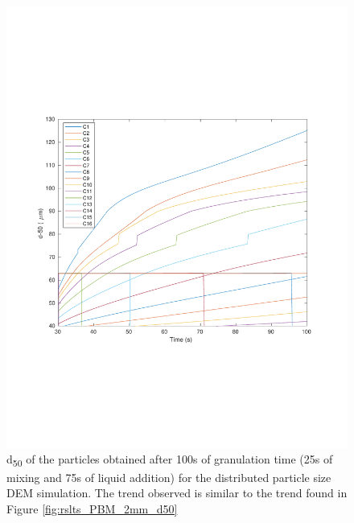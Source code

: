 \documentclass[preprint,11pt,authoryear]{elsarticle}
\begin{document}
\begin{figure}[H]
\centering
\includegraphics[scale=0.5]{rslts_pbm_d50_128_555.pdf}
\caption{d\textsubscript{50} of the particles obtained after 100s of granulation time (25s of mixing and 75s of 
liquid addition) for the distributed particle size DEM simulation. The trend observed is similar to the trend 
found in Figure \ref{fig:rslts_PBM_2mm_d50}}
\label{fig:rslts_PBM_psd_d50}
\end{figure}
\end{document}
